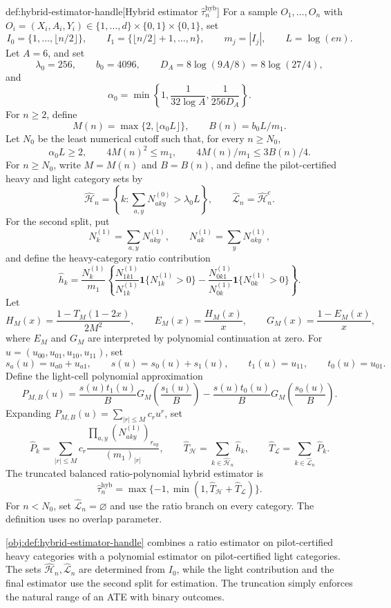 \begin{definitionv}{def:hybrid-estimator-handle}[Hybrid estimator \(\widehat\tau_n^{\mathrm{hyb}}\)]
For a sample \(O_1,\ldots,O_n\) with \(O_i=(X_i,A_i,Y_i)\in\{1,\ldots,d\}\times\{0,1\}\times\{0,1\}\), set
\[
I_0=\{1,\ldots,\lfloor n/2\rfloor\},\qquad
I_1=\{\lfloor n/2\rfloor+1,\ldots,n\},\qquad
m_j=|I_j|,\qquad
L=\log(en).
\]
Let \(A=6\), and set
\[
\lambda_0=256,\qquad
b_0=4096,\qquad
D_A=8\log(9A/8)=8\log(27/4),
\]
and
\[
\alpha_0
=
\min\left\{
1,\frac1{32\log A},\frac1{256D_A}
\right\}.
\]
For \(n\ge2\), define
\[
M(n)=\max\{2,\lfloor\alpha_0L\rfloor\},
\qquad
B(n)=b_0L/m_1.
\]
Let \(N_0\) be the least numerical cutoff such that, for every \(n\ge N_0\),
\[
\alpha_0L\ge2,\qquad
4M(n)^2\le m_1,\qquad
4M(n)/m_1\le 3B(n)/4.
\]
For \(n\ge N_0\), write \(M=M(n)\) and \(B=B(n)\), and define the pilot-certified heavy and light category sets by
\[
\widehat{\mathcal H}_n
=
\left\{
k:\sum_{a,y}N^{(0)}_{aky}>\lambda_0L
\right\},
\qquad
\widehat{\mathcal L}_n=\widehat{\mathcal H}_n^c.
\]
For the second split, put
\[
N_k^{(1)}=\sum_{a,y}N^{(1)}_{aky},
\qquad
N_{ak}^{(1)}=\sum_yN^{(1)}_{aky},
\]
and define the heavy-category ratio contribution
\[
\widehat h_k
=
\frac{N_k^{(1)}}{m_1}
\left\{
\frac{N^{(1)}_{1k1}}{N^{(1)}_{1k}}\mathbf1\{N^{(1)}_{1k}>0\}
-
\frac{N^{(1)}_{0k1}}{N^{(1)}_{0k}}\mathbf1\{N^{(1)}_{0k}>0\}
\right\}.
\]
Let
\[
H_M(x)=\frac{1-T_M(1-2x)}{2M^2},
\qquad
E_M(x)=\frac{H_M(x)}{x},
\qquad
G_M(x)=\frac{1-E_M(x)}{x},
\]
where \(E_M\) and \(G_M\) are interpreted by polynomial continuation at zero. For \(u=(u_{00},u_{01},u_{10},u_{11})\), set
\[
s_a(u)=u_{a0}+u_{a1},\qquad
s(u)=s_0(u)+s_1(u),\qquad
t_1(u)=u_{11},\qquad
t_0(u)=u_{01}.
\]
Define the light-cell polynomial approximation
\[
P_{M,B}(u)
=
\frac{s(u)t_1(u)}B
G_M\!\left(\frac{s_1(u)}B\right)
-
\frac{s(u)t_0(u)}B
G_M\!\left(\frac{s_0(u)}B\right).
\]
Expanding \(P_{M,B}(u)=\sum_{|r|\le M}c_ru^r\), set
\[
\widehat P_k
=
\sum_{|r|\le M}
c_r
\frac{\prod_{a,y}(N^{(1)}_{aky})_{r_{ay}}}{(m_1)_{|r|}},
\qquad
\widehat T_{\mathcal H}
=
\sum_{k\in\widehat{\mathcal H}_n}\widehat h_k,
\qquad
\widehat T_{\mathcal L}
=
\sum_{k\in\widehat{\mathcal L}_n}\widehat P_k.
\]
The truncated balanced ratio-polynomial hybrid estimator is
\[
\widehat\tau_n^{\mathrm{hyb}}
=
\max\{-1,\min(1,\widehat T_{\mathcal H}+\widehat T_{\mathcal L})\}.
\]
For \(n<N_0\), set \(\widehat{\mathcal L}_n=\varnothing\) and use the ratio branch on every category. The definition uses no overlap parameter.
\end{definitionv}

\cref{obj:def:hybrid-estimator-handle} combines a ratio estimator on pilot-certified heavy categories with a polynomial estimator on pilot-certified light categories. The sets \ensuremath{\widehat{\mathcal H}_n,\widehat{\mathcal L}_n} are determined from \(I_0\), while the light contribution  and the final estimator  use the second split for estimation. The truncation simply enforces the natural range of an ATE with binary outcomes.

